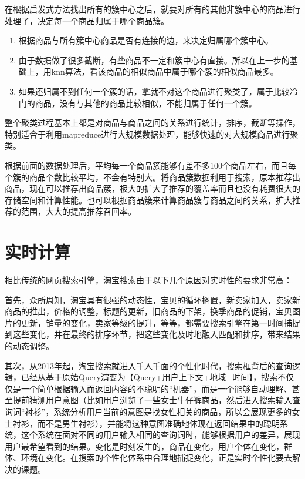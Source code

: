 在根据启发式方法找出所有的簇中心之后，就要对所有的其他非簇中心的商品进行处理了，决定每一个商品归属于哪个商品簇。
\begin{enumerate}
\item 根据商品与所有簇中心商品是否有连接的边，来决定归属哪个簇中心。
\item 由于数据做了很多截断，有些商品不一定和簇中心有直接。所以在上一步的基础上，用knn算法，看该商品的相似商品中属于哪个簇的相似商品最多。
\item 如果还归属不到任何一个簇的话，拿就不对这个商品进行聚类了，属于比较冷门的商品，没有与其他的商品比较相似，不能归属于任何一个簇。
\end{enumerate}

整个聚类过程基本上都是对商品与商品之间的关系进行统计，排序，截断等操作，特别适合于利用mapreduce进行大规模数据处理，能够快速的对大规模商品进行聚类。
 
根据前面的数据处理后，平均每一个商品簇能够有差不多100个商品左右，而且每个簇的商品个数比较平均，不会有特别大。将商品簇数据利用于搜索，原本推荐出商品，现在可以推荐出商品簇，极大的扩大了推荐的覆盖率而且也没有耗费很大的存储空间和计算性能。也可以根据商品簇来计算商品簇与商品之间的关系，扩大推荐的范围，大大的提高推荐召回率。

\section{实时计算}
相比传统的网页搜索引擎，淘宝搜索由于以下几个原因对实时性的要求非常高：

首先，众所周知，淘宝具有很强的动态性，宝贝的循环搁置，新卖家加入，卖家新商品的推出，价格的调整，标题的更新，旧商品的下架，换季商品的促销，宝贝图片的更新，销量的变化，卖家等级的提升，等等，都需要搜索引擎在第一时间捕捉到这些变化，并在最终的排序环节，把这些变化及时地融入匹配和排序，带来结果的动态调整。

其次，从2013年起，淘宝搜索就进入千人千面的个性化时代，搜索框背后的查询逻辑，已经从基于原始Query演变为【Query+用户上下文+地域+时间】，搜索不仅仅是一个简单根据输入而返回内容的不聪明的“机器”，而是一个能够自动理解、甚至提前猜测用户意图（比如用户浏览了一些女士牛仔裤商品，然后进入搜索输入查询词“衬衫”，系统分析用户当前的意图是找女性相关的商品，所以会展现更多的女士衬衫，而不是男生衬衫），并能将这种意图准确地体现在返回结果中的聪明系统，这个系统在面对不同的用户输入相同的查询词时，能够根据用户的差异，展现用户最希望看到的结果。变化是时刻发生的，商品在变化，用户个体在变化，群体、环境在变化。在搜索的个性化体系中合理地捕捉变化，正是实时个性化要去解决的课题。

